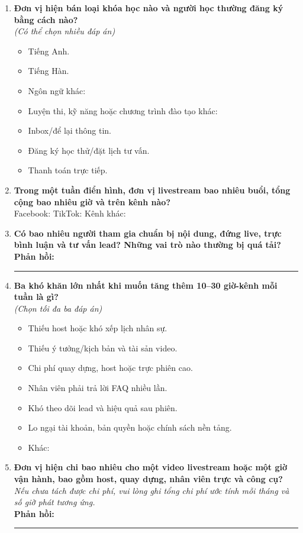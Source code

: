 \begin{enumerate}
    \item \textbf{Đơn vị hiện bán loại khóa học nào và người học thường đăng ký
    bằng cách nào?} \\
    \textit{(Có thể chọn nhiều đáp án)}
    \begin{itemize}
        \item[$\square$] Tiếng Anh.
        \item[$\square$] Tiếng Hàn.
        \item[$\square$] Ngôn ngữ khác: \dotfill
        \item[$\square$] Luyện thi, kỹ năng hoặc chương trình đào tạo khác:
        \dotfill
        \item[$\square$] Inbox/để lại thông tin.
        \item[$\square$] Đăng ký học thử/đặt lịch tư vấn.
        \item[$\square$] Thanh toán trực tiếp.
    \end{itemize}

    \item \textbf{Trong một tuần điển hình, đơn vị livestream bao nhiêu buổi,
    tổng cộng bao nhiêu giờ và trên kênh nào?} \\
    Facebook: \dotfill \quad TikTok: \dotfill \quad Kênh khác: \dotfill

    \item \textbf{Có bao nhiêu người tham gia chuẩn bị nội dung, đứng live, trực
    bình luận và tư vấn lead? Những vai trò nào thường bị quá tải?} \\
    \textbf{Phản hồi:} \rule{0.72\linewidth}{0.4pt}

    \item \textbf{Ba khó khăn lớn nhất khi muốn tăng thêm 10--30 giờ-kênh mỗi
    tuần là gì?} \\
    \textit{(Chọn tối đa ba đáp án)}
    \begin{itemize}
        \item[$\square$] Thiếu host hoặc khó xếp lịch nhân sự.
        \item[$\square$] Thiếu ý tưởng/kịch bản và tài sản video.
        \item[$\square$] Chi phí quay dựng, host hoặc trực phiên cao.
        \item[$\square$] Nhân viên phải trả lời FAQ nhiều lần.
        \item[$\square$] Khó theo dõi lead và hiệu quả sau phiên.
        \item[$\square$] Lo ngại tài khoản, bản quyền hoặc chính sách nền tảng.
        \item[$\square$] Khác: \dotfill
    \end{itemize}

    \item \textbf{Đơn vị hiện chi bao nhiêu cho một video livestream hoặc một
    giờ vận hành, bao gồm host, quay dựng, nhân viên trực và công cụ?} \\
    \textit{Nếu chưa tách được chi phí, vui lòng ghi tổng chi phí ước tính mỗi
    tháng và số giờ phát tương ứng.} \\
    \textbf{Phản hồi:} \rule{0.72\linewidth}{0.4pt}
\end{enumerate}

